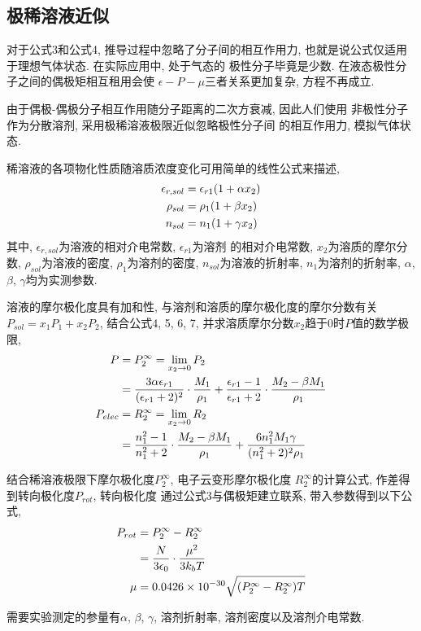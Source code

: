\documentclass[a4paper]{article}
\begin{document}
\subsection{极稀溶液近似}
对于公式3和公式4, 推导过程中忽略了分子间的相互作用力, 
也就是说公式仅适用于理想气体状态. 在实际应用中, 处于气态的
极性分子毕竟是少数. 在液态极性分子之间的偶极矩相互租用会使
$\epsilon-P-\mu$三者关系更加复杂, 方程不再成立.
\par
由于偶极-偶极分子相互作用随分子距离的二次方衰减, 因此人们使用
非极性分子作为分散溶剂, 采用极稀溶液极限近似忽略极性分子间
的相互作用力, 模拟气体状态.
\par
稀溶液的各项物化性质随溶质浓度变化可用简单的线性公式来描述, 
\begin{equation}
	\centering
	\begin{aligned}
		\epsilon_{r, sol} &= \epsilon_{r1}(1+\alpha x_{2})\\
		\rho_{sol} &= \rho_{1}(1+\beta x_{2})\\
		n_{sol} &= n_{1}(1+\gamma x_{2})\\
	\end{aligned}
\end{equation}
其中, $\epsilon_{r, sol}$为溶液的相对介电常数, $\epsilon_{r1}$为溶剂
的相对介电常数, $x_{2}$为溶质的摩尔分数, $\rho_{sol}$为溶液的密度, 
$\rho_{1}$为溶剂的密度, $n_{sol}$为溶液的折射率, $n_{1}$为溶剂的折射率, 
$\alpha$, $\beta$, $\gamma$均为实测参数.
\par
溶液的摩尔极化度具有加和性, 与溶剂和溶质的摩尔极化度的摩尔分数有关
$P_{sol} = x_{1}P_{1}+x_{2}P_{2}$, 
结合公式4, 5, 6, 7, 并求溶质摩尔分数$x_{2}$趋于0时$P$值的数学极限, 
\begin{equation}
	\centering
	\begin{aligned}
		P &= P_{2}^{\infty} = \lim\limits_{x_{2}\to 0} P_{2}\\
	  &=\frac{3\alpha\epsilon_{r1}}{(\epsilon_{r1}+2)^{2}}\cdot \frac{M_{1}}{\rho_{1}}
	  + \frac{\epsilon_{r1}-1}{\epsilon_{r1}+2}\cdot \frac{M_{2}-\beta M_{1}}{\rho_{1}}\\
	P_{elec} &= R_{2}^{\infty} = \lim\limits_{x_{2}\to 0}R_{2}\\
			 &=\frac{n_{1}^{2}-1}{n_{1}^{2}+2}\cdot \frac{M_{2}-\beta M_{1}}{\rho_{1}}
			 +\frac{6n_{1}^{2}M_{1}\gamma}{(n_{1}^{2}+2)^{2}\rho_{1}}\\
	\end{aligned}
\end{equation}
\par
结合稀溶液极限下摩尔极化度$P_{2}^{\infty}$, 电子云变形摩尔极化度
$R_{2}^{\infty}$的计算公式, 作差得到转向极化度$P_{rot}$, 转向极化度
通过公式3与偶极矩建立联系, 带入参数得到以下公式, 
\begin{equation}
	\centering
	\begin{aligned}
		P_{rot} &= P_{2}^{\infty} - R_{2}^{\infty}\\
				&=\frac{N}{3\epsilon_{0}}\cdot \frac{\mu^{2}}{3k_{b}T}\\
		\mu &= 0.0426\times 10^{-30} \sqrt{(P_{2}^{\infty} - R_{2}^{\infty})T}\\
	\end{aligned}
\end{equation}
\par
需要实验测定的参量有$\alpha$, $\beta$, $\gamma$, 溶剂折射率, 溶剂密度以及溶剂介电常数.
\end{document}
